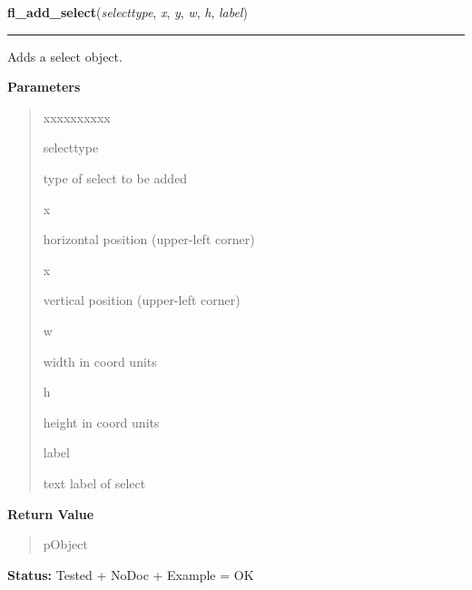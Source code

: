     \label{xformslib:library:fl_add_select}

    \vspace{0.5ex}

\hspace{.8\funcindent}\begin{boxedminipage}{\funcwidth}

    \raggedright \textbf{fl\_add\_select}(\textit{selecttype}, \textit{x}, \textit{y}, \textit{w}, \textit{h}, \textit{label})

    \vspace{-1.5ex}

    \rule{\textwidth}{0.5\fboxrule}
\setlength{\parskip}{2ex}
    Adds a select object.

\setlength{\parskip}{1ex}
      \textbf{Parameters}
      \vspace{-1ex}

      \begin{quote}
        \begin{Ventry}{xxxxxxxxxx}

          \item[selecttype]

          type of select to be added

          \item[x]

          horizontal position (upper-left corner)

          \item[x]

          vertical position (upper-left corner)

          \item[w]

          width in coord units

          \item[h]

          height in coord units

          \item[label]

          text label of select

        \end{Ventry}

      \end{quote}

      \textbf{Return Value}
    \vspace{-1ex}

      \begin{quote}
      pObject

      \end{quote}

\textbf{Status:} Tested + NoDoc + Example = OK



    \end{boxedminipage}

